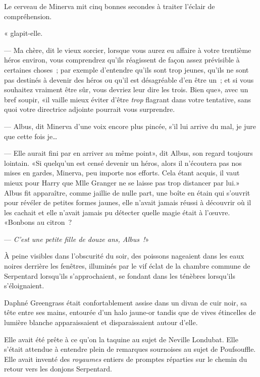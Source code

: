 Le cerveau de Minerva mit cinq bonnes secondes à traiter l'éclair de compréhension.

« glapit-elle.

--- Ma chère, dit le vieux sorcier, lorsque vous aurez eu affaire à votre trentième héros environ, vous comprendrez qu'ils réagissent de façon assez prévisible à certaines choses~; par exemple d'entendre qu'ils sont trop jeunes, qu'ils ne sont pas destinés à devenir des héros ou qu'il est désagréable d'en être un~; et si vous souhaitez vraiment être sûr, vous devriez leur dire les trois. Bien que», avec un bref soupir, «il vaille mieux éviter d'être \emph{trop} flagrant dans votre tentative, sans quoi votre directrice adjointe pourrait vous surprendre.

--- Albus, dit Minerva d'une voix encore plus pincée, s'il lui arrive du mal, je jure que cette fois je…

--- Elle aurait fini par en arriver au même point», dit Albus, son regard toujours lointain. «Si quelqu'un est censé devenir un héros, alors il n'écoutera pas nos mises en gardes, Minerva, peu importe nos efforts. Cela étant acquis, il vaut mieux pour Harry que Mlle Granger ne se laisse pas trop distancer par lui.» Albus fit apparaître, comme jaillie de nulle part, une boîte en étain qui s'ouvrit pour révéler de petites formes jaunes, elle n'avait jamais réussi à découvrir où il les cachait et elle n'avait jamais pu détecter quelle magie était à l'œuvre. «Bonbons au citron~?

--- \emph{C'est une petite fille de douze ans, Albus~!}»


À peine visibles dans l'obscurité du soir, des poissons nageaient dans les eaux noires derrière les fenêtres, illuminés par le vif éclat de la chambre commune de Serpentard lorsqu'ils s'approchaient, se fondant dans les ténèbres lorsqu'ils s'éloignaient.

Daphné Greengrass était confortablement assise dans un divan de cuir noir, sa tête entre ses mains, entourée d'un halo jaune-or tandis que de vives étincelles de lumière blanche apparaissaient et disparaissaient autour d'elle.

Elle avait été prête à ce qu'on la taquine au sujet de Neville Londubat. Elle s'était attendue à entendre plein de remarques sournoises au sujet de Poufsouffle. Elle avait inventé des \emph{royaumes} entiers de promptes réparties sur le chemin du retour vers les donjons Serpentard.

